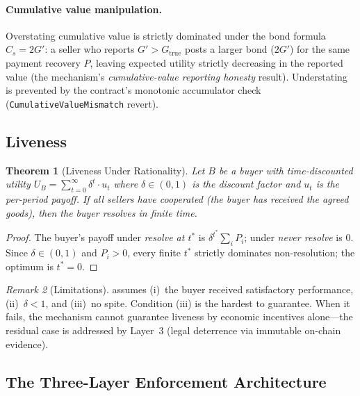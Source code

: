 \documentclass[11pt,a4paper]{article}
\newtheorem{theorem}{Theorem}[section]
\theoremstyle{definition}
\theoremstyle{remark}
\newtheorem{remark}[theorem]{Remark}
\newcommand{\pay}{P}
\newcommand{\cumval}{G}
\newcommand{\sbond}{C_s}
\begin{document}
\paragraph{Cumulative value manipulation.}
Overstating cumulative value is strictly dominated under the bond
formula $\sbond = 2\cumval'$: a seller who reports
$\cumval' > \cumval_{\text{true}}$ posts a larger bond
($2\cumval'$) for the same payment recovery $\pay$, leaving expected
utility strictly decreasing in the reported value (the mechanism's
\emph{cumulative-value reporting honesty} result). Understating is
prevented by the contract's monotonic accumulator check
(\texttt{CumulativeValueMismatch} revert).

\subsection{Liveness}

\begin{theorem}[Liveness Under Rationality]
\label{thm:liveness}
Let $B$ be a buyer with time-discounted utility
$U_B = \sum_{t=0}^{\infty} \delta^t \cdot u_t$ where
$\delta \in (0, 1)$ is the discount factor and $u_t$ is the
per-period payoff. If all sellers have cooperated (the buyer has
received the agreed goods), then the buyer resolves in finite time.
\end{theorem}

\begin{proof}
The buyer's payoff under \emph{resolve at $t^*$} is $\delta^{t^*}
\sum_i \pay_i$; under \emph{never resolve} is $0$. Since
$\delta \in (0,1)$ and $\pay_i > 0$, every finite $t^*$ strictly
dominates non-resolution; the optimum is $t^* = 0$.
\end{proof}

\begin{remark}[Limitations]
\label{rem:liveness-limitations}
 assumes (i)~the buyer received satisfactory
performance, (ii)~$\delta < 1$, and (iii)~no spite. Condition (iii)
is the hardest to guarantee. When it fails, the mechanism cannot
guarantee liveness by economic incentives alone---the residual case
is addressed by Layer~3 (legal deterrence via immutable on-chain
evidence).
\end{remark}

\subsection{The Three-Layer Enforcement Architecture}
\end{document}
